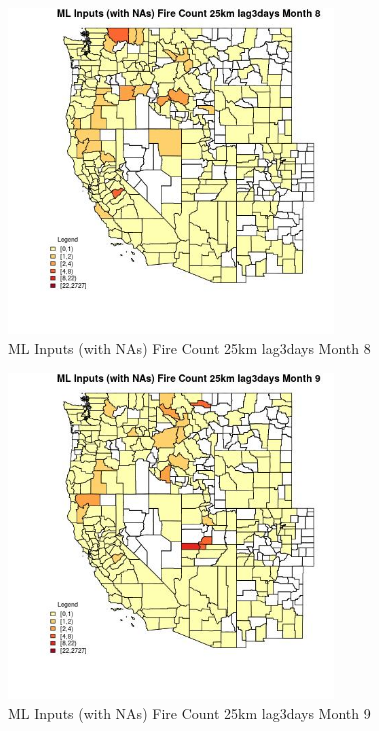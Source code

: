 \begin{figure} 
\centering  
\includegraphics[width=0.77\textwidth]{Code_Outputs/Report_ML_input_PM25_Step4_part_f_de_duplicated_aves_prioritize_24hr_obswNAs_CountyFire_Count_25km_lag3daysmedianMonth8.jpg} 
\caption{\label{fig:Report_ML_input_PM25_Step4_part_f_de_duplicated_aves_prioritize_24hr_obswNAsCountyFire_Count_25km_lag3daysmedianMonth8}ML Inputs (with NAs) Fire Count 25km lag3days Month 8} 
\end{figure} 
 

\begin{figure} 
\centering  
\includegraphics[width=0.77\textwidth]{Code_Outputs/Report_ML_input_PM25_Step4_part_f_de_duplicated_aves_prioritize_24hr_obswNAs_CountyFire_Count_25km_lag3daysmedianMonth9.jpg} 
\caption{\label{fig:Report_ML_input_PM25_Step4_part_f_de_duplicated_aves_prioritize_24hr_obswNAsCountyFire_Count_25km_lag3daysmedianMonth9}ML Inputs (with NAs) Fire Count 25km lag3days Month 9} 
\end{figure} 
 

